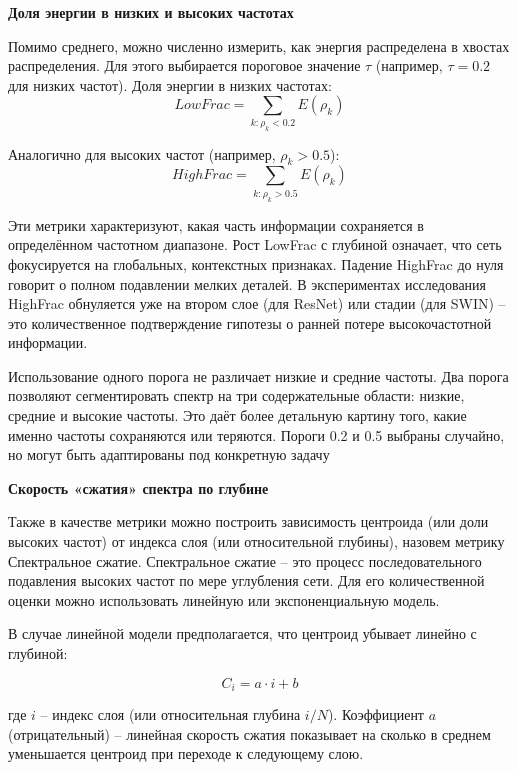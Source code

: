 \textbf{Доля энергии в низких и высоких частотах}

Помимо среднего, можно численно измерить, как энергия распределена в хвостах распределения. Для этого выбирается пороговое значение $\tau$ (например, $\tau = 0.2$ для низких частот). Доля энергии в низких частотах:
\begin{equation}
    LowFrac = \sum_{k:\rho_k<0.2} E(\rho_k)
\end{equation}

Аналогично для высоких частот (например, $\rho_k > 0.5$):
\begin{equation}
    HighFrac = \sum_{k:\rho_k>0.5} E(\rho_k)
\end{equation}

Эти метрики характеризуют, какая часть информации сохраняется в определённом частотном диапазоне. Рост LowFrac с глубиной означает, что сеть фокусируется на глобальных, контекстных признаках. Падение HighFrac до нуля говорит о полном подавлении мелких деталей. В экспериментах исследования HighFrac обнуляется уже на втором слое (для ResNet) или стадии (для SWIN) – это количественное подтверждение гипотезы о ранней потере высокочастотной информации.

Использование одного порога не различает низкие и средние частоты. Два порога позволяют сегментировать спектр на три содержательные области: низкие, средние и высокие частоты. Это даёт более детальную картину того, какие именно частоты сохраняются или теряются. Пороги 0.2 и 0.5 выбраны случайно, но могут быть адаптированы под конкретную задачу 

\textbf{Скорость «сжатия» спектра по глубине}

Также в качестве метрики можно построить зависимость центроида (или доли высоких частот) от индекса слоя (или относительной глубины), назовем метрику Спектральное сжатие. Спектральное сжатие – это процесс последовательного подавления высоких частот по мере углубления сети. Для его количественной оценки можно использовать линейную или экспоненциальную модель. 

В случае линейной модели предполагается, что центроид убывает линейно с глубиной:

\begin{equation}
    C_{i}= a \cdot i + b
\end{equation}

где $i$ – индекс слоя (или относительная глубина $i/N$). Коэффициент $a$ (отрицательный) – линейная скорость сжатия показывает на сколько в среднем уменьшается центроид при переходе к следующему слою.

